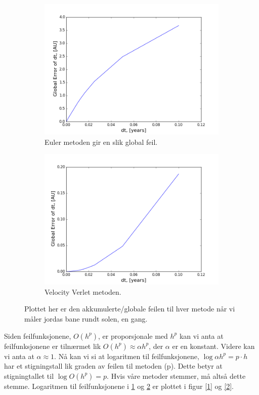 \documentclass[11pt,a4paper]{article}
\begin{document}
\FloatBarrier
\begin{figure}[!ht]
\centering
\begin{subfigure}{.5\textwidth}
  \centering
  \includegraphics[width=1.1\linewidth]{Euler_Global.png}
  \caption{Euler metoden gir en slik global feil.}
  \label{feil_euler}
\end{subfigure}%
\begin{subfigure}{.5\textwidth}
  \centering
  \includegraphics[width=1.1\linewidth]{Verlet_Global.png}
  \caption{Velocity Verlet metoden. }
  \label{feil_verlet}
\end{subfigure}
\caption{Plottet her er den akkumulerte/globale feilen til hver metode når vi måler jordas bane rundt solen, en gang.}
\label{fig:duh}
\end{figure}
\FloatBarrier
Siden feilfunksjonene, $O(h^{p})$, er proporsjonale med $h^p$ kan vi anta at feilfunksjonene er tilnærmet lik $O(h^{p}) \approx \alpha h^p$, der $\alpha$ er en konstant. 
Videre kan vi anta at $\alpha \approx 1$. Nå kan vi si at logaritmen til feilfunksjonene, $\log{\alpha h^p} =p\cdot h$
har et stigningstall lik graden av feilen til metoden (p). 
Dette betyr at stigningtallet til $\log{O(h^{p})} = p$. 
Hvis våre metoder stemmer, må altså dette stemme. Logaritmen til feilfunksjonene i \ref{feil_euler} og \ref{feil_verlet} er plottet i 
figur \ref{1} og \ref{2}.\\
\end{document}
